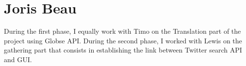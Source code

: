 \section{Joris Beau}
During the first phase, I equally work with Timo on the Translation part of the project using Globse API.
During the second phase, I worked with Lewis on the gathering part that consists in establishing the link between Twitter search API and GUI.